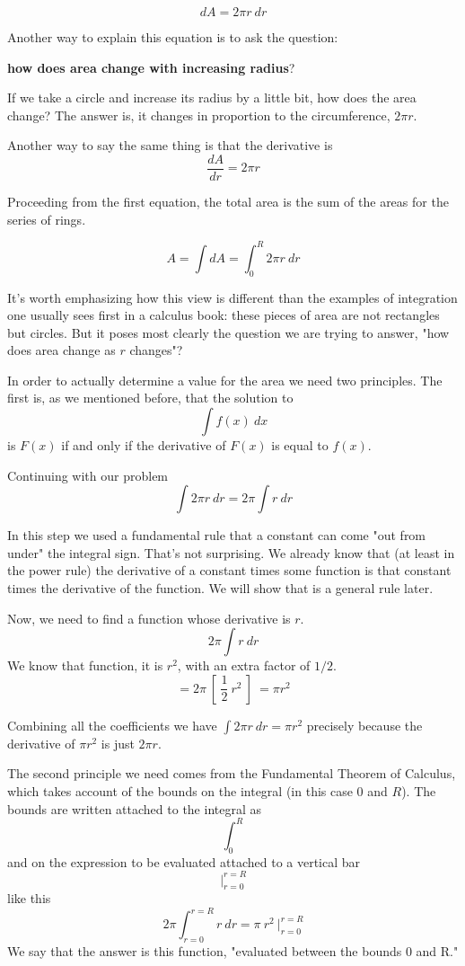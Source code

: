 \documentclass[11pt, oneside]{article}
\begin{document}
\[ dA = 2 \pi r \ dr \]

Another way to explain this equation is to ask the question:

\textbf{how does area change with increasing radius}?  

If we take a circle and increase its radius by a little bit, how does the area change?  The answer is, it changes in proportion to the circumference, $2 \pi r$.

Another way to say the same thing is that the derivative is
\[ \frac{dA}{dr} = 2 \pi r \]

Proceeding from the first equation, the total area is the sum of the areas for the series of rings.

\[ A = \int dA = \int_0^R 2 \pi r \ dr \]

It's worth emphasizing how this view is different than the examples of integration one usually sees first in a calculus book:  these pieces of area are not rectangles but circles.  But it poses most clearly the question we are trying to answer, "how does area change as $r$ changes"?

In order to actually determine a value for the area we need two principles.  The first is, as we mentioned before, that the solution to
\[ \int f(x) \ dx \] 
is $F(x)$ if and only if the derivative of $F(x)$ is equal to $f(x)$.

Continuing with our problem
\[ \int 2 \pi r \ dr = 2 \pi \int r \ dr  \]

In this step we used a fundamental rule that a constant can come "out from under" the integral sign.  That's not surprising.  We already know that (at least in the power rule) the derivative of a constant times some function is that constant times the derivative of the function.  We will show that is a general rule later.

Now,  we need to find a function whose derivative is $r$.  
\[ 2 \pi \int r \ dr  \]
We know that function, it is $r^2$, with an extra factor of $1/2$.  
\[ = 2 \pi \ [ \ \frac{1}{2} \ r^2 \ ] \ = \pi r^2  \]

Combining all the coefficients we have $\int 2 \pi r \ dr = \pi r^2$ precisely because the derivative of $\pi r^2$ is just $2 \pi r$.

The second principle we need comes from the Fundamental Theorem of Calculus, which takes account of the bounds on the integral (in this case $0$ and $R$).  The bounds are written attached to the integral as
\[ \int_0^R \]
and on the expression to be evaluated attached to a vertical bar
\[  \bigg|_{r=0}^{r=R} \]
 like this
\[ 2 \pi \int_{r=0}^{r=R}  r \ dr = \pi \ r^2 \ \bigg|_{r=0}^{r=R} \]
We say that the answer is this function, "evaluated between the bounds 0 and R."
\end{document}
